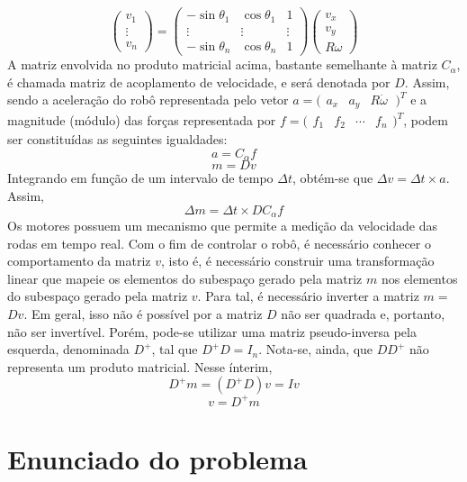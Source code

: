 \documentclass{article}
\begin{document}
\[
\begin{pmatrix}v_{1}\\ \vdots \\ v_{n} \end{pmatrix}
=
\begin{pmatrix}
  -\sin\theta_1 & \cos\theta_1  & 1 \\
  \vdots & \vdots & \vdots  \\
  -\sin\theta_n & \cos\theta_n  & 1
 \end{pmatrix}
\begin{pmatrix}v_{x}\\ v_y \\ R\omega \end{pmatrix}
\]
A matriz envolvida no produto matricial acima, bastante semelhante à matriz $C_\alpha$, é chamada matriz de acoplamento de velocidade, e será denotada por $D$.
\hspace{1cm}Assim, sendo a aceleração do robô representada pelo vetor $a=\bigl(\begin{smallmatrix}a_{x}&a_{y}&R\dot{\omega}\ \end{smallmatrix})^T$ e a magnitude (módulo) das forças representada por $f=\bigl(\begin{smallmatrix}f_{1}&f_{2}&\cdots&f_{n} \end{smallmatrix})^T$, podem ser constituídas as seguintes igualdades:
\[a=C_{\alpha}f\]
\[m=Dv\]
\hspace{1cm}Integrando em função de um intervalo de tempo $\Delta t$, obtém-se que $\Delta v=\Delta t \times a$. Assim,
\[\Delta m=\Delta t\times DC_{\alpha}f\]
\hspace{1cm}Os motores possuem um mecanismo que permite a medição da velocidade das rodas em tempo real. Com o fim de controlar o robô, é necessário conhecer o comportamento da matriz $v$, isto é, é necessário construir uma transformação linear que mapeie os elementos do subespaço gerado pela matriz $m$ nos elementos do subespaço gerado pela matriz $v$.
Para tal, é necessário inverter a matriz $m$$=$$D$$v$. Em geral, isso não é possível por a matriz $D$ não ser quadrada e, portanto, não ser invertível. Porém, pode-se utilizar uma matriz pseudo-inversa pela esquerda, denominada $D^+$, tal que $D^+ D=I_n$. Nota-se, ainda, que $DD^+$ não representa um produto matricial. Nesse ínterim, 
\[D^+m=(D^+D)v=Iv\]
\[v=D^+m\]



\section{Enunciado do problema}
\end{document}
